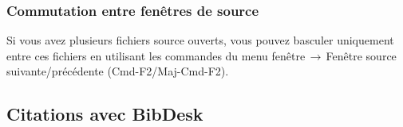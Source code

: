 \documentclass[11pt,french]{article}
\newcommand{\TS}{\textsf{\TeX Shop}}
\newcommand{\acr}[1]{\textsf{#1}}
\newcommand{\cmd}[1]{\textsf{#1}}
\newcommand{\mnu}[1]{\textsf{#1}}
\newcommand{\To}{\,\(\to\)\,}
\begin{document}
%

\subsubsection{Commutation entre fenêtres de source}

Si vous avez plusieurs fichiers source ouverts, vous pouvez basculer uniquement entre ces fichiers en utilisant les commandes du menu \mnu{fenêtre}\To\mnu{Fenêtre source suivante/précédente} (\cmd{Cmd-F2}/\cmd{Maj-Cmd-F2}).


\subsection{Citations avec \cmd{BibDesk}}
\end{document}
